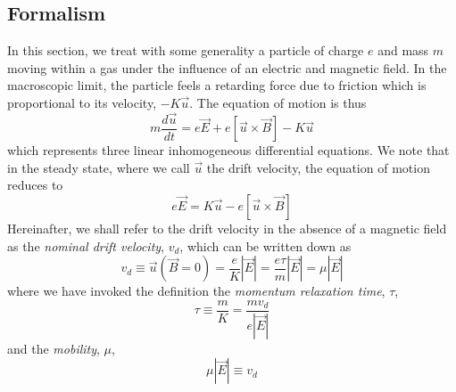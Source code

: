 \documentclass[twoside]{article}
\begin{document}
\begin{multicols}{2} %

\section{Formalism}
In this section, we treat with some generality a particle of charge $e$ and mass $m$ moving within a gas under the influence of an electric and magnetic field. %
In the macroscopic limit, the particle feels a retarding force due to friction which is proportional to its velocity,  $-K\vec{u}$. The equation of motion is thus
\begin{equation}
\label{eq:motion}
m\frac{d\vec{u}}{dt} = e\vec{E} + e[\vec{u} \times \vec{B}] - K\vec{u}
\end{equation}
which represents three linear inhomogeneous differential equations. We note that in the steady state, where we call $\vec{u}$ the drift velocity, the equation of motion reduces to
\begin{equation}
\label{eq:motion}
e\vec{E}  =  K\vec{u} - e[\vec{u} \times \vec{B}]
\end{equation}
Hereinafter, we shall refer to the drift velocity in the absence of a magnetic field as the \emph{nominal drift velocity}, $v_d$, which can be written down as
\begin{equation}
\label{eq:nob}
v_d \equiv \vec{u}(\vec{B} = 0) = \frac{e}{K} |\vec{E}| = \frac{e \tau}{m} |\vec{E}| = \mu |\vec{E}| 
\end{equation}
where we have invoked the definition the \emph{momentum relaxation time}, $\tau$,
\begin{equation}
\tau \equiv  \frac{m}{K} = \frac{m v_d}{e|\vec{E}|}
\end{equation}
and the \emph{mobility}, $\mu$,
\begin{equation}
\mu |\vec{E}| \equiv v_d
\end{equation}




\end{multicols}
\end{document}
